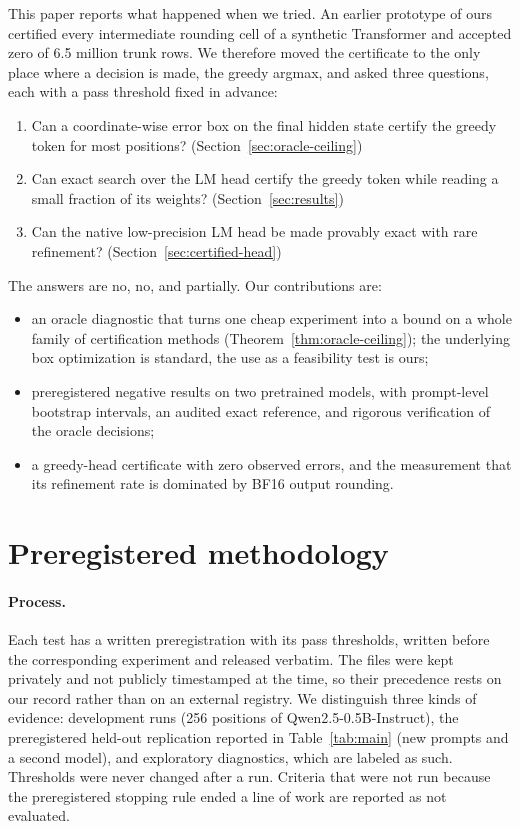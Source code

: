 \documentclass[11pt]{article}
\theoremstyle{definition}
\begin{document}
This paper reports what happened when we tried. An earlier prototype of ours
certified every intermediate rounding cell of a synthetic Transformer and accepted
zero of 6.5 million trunk rows. We therefore moved the certificate to the only place
where a decision is made, the greedy argmax, and asked three questions, each with a
pass threshold fixed in advance:
\begin{enumerate}
\item Can a coordinate-wise error box on the final hidden state certify the greedy
token for most positions? (Section~\ref{sec:oracle-ceiling})
\item Can exact search over the LM head certify the greedy token while reading a
small fraction of its weights? (Section~\ref{sec:results})
\item Can the native low-precision LM head be made provably exact with rare
refinement? (Section~\ref{sec:certified-head})
\end{enumerate}
The answers are no, no, and partially. Our contributions are:
\begin{itemize}
\item an oracle diagnostic that turns one cheap experiment into a bound on a whole
family of certification methods (Theorem~\ref{thm:oracle-ceiling}); the underlying
box optimization is standard, the use as a feasibility test is ours;
\item preregistered negative results on two pretrained models, with prompt-level
bootstrap intervals, an audited exact reference, and rigorous verification of the
oracle decisions;
\item a greedy-head certificate with zero observed errors, and the measurement
that its refinement rate is dominated by BF16 output rounding.
\end{itemize}





\section{Preregistered methodology}
\label{sec:method}
\paragraph{Process.} Each test has a written preregistration with its pass
thresholds, written before the corresponding experiment and released verbatim. The
files were kept privately and not publicly timestamped at the time, so their
precedence rests on our record rather than on an external registry. We distinguish three
kinds of evidence: development runs (256 positions of Qwen2.5-0.5B-Instruct), the
preregistered held-out replication reported in Table~\ref{tab:main} (new prompts
and a second model), and exploratory diagnostics, which are labeled as such.
Thresholds were never changed after a run. Criteria that were not run because the
preregistered stopping rule ended a line of work are reported as not evaluated.
\end{document}
